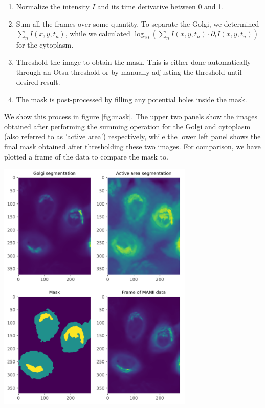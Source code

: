 \documentclass{Dissertate}
\let\origfigure\figure
\let\endorigfigure\endfigure
\renewenvironment{figure}[1][2] {
    \expandafter\origfigure\expandafter[H]
} {
    \endorigfigure
}
\providecommand{\tightlist}{%
  \setlength{\itemsep}{0pt}\setlength{\parskip}{0pt}}
\begin{document}
\begin{enumerate}
\def\labelenumi{\arabic{enumi}.}
\tightlist
\item
  Normalize the intensity \(I\) and its time derivative between 0 and 1.
\item
  Sum all the frames over some quantity. To separate the Golgi, we determined \(\sum_n I(x, y, t_n)\), while we calculated \(\log_{10}\left(\sum_nI(x,y,t_n)\cdot\partial_tI(x,y,t_n)\right)\) for the cytoplasm. 
 \item
  Threshold the image to obtain the mask. This is either done
  automatically through an Otsu threshold or by manually adjusting the
  threshold until desired result.
\item
  The mask is post-processed by filling any potential holes inside the
  mask.
\end{enumerate}

We show this process in figure \ref{fig:mask}. The upper two panels show
the images obtained after performing the summing operation for the Golgi
and cytoplasm (also referred to as 'active area') respectively, while the lower left panel shows the final mask obtained after thresholding these two images. For comparison, we have plotted a frame of the data to compare the mask to. 

\begin{figure}
\hypertarget{fig:mask}{%
\centering
\includegraphics[width=0.7\textwidth]{source/figures/pdf/segmenting.pdf}
\caption{Four panels showing the different stages of making the mask.
From segmenting the upper two panels we determine the Golgi and active
area, leading to the mask in the lower left. This can be compared to the actual data in the lower right frame. }\label{fig:mask}
}
\end{figure}
\end{document}
